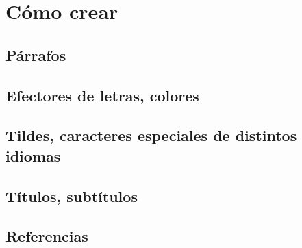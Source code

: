 \documentclass[10pt,journal,compsoc]{IEEEtran}
\begin{document}
\renewcommand{\thesubsection}{\thesection.\alph{subsection}}

\section{C\'omo crear}
	\subsection{P\'arrafos}	
	\subsection{Efectores de letras, colores}
	\subsection{Tildes, caracteres especiales de distintos idiomas}
	\subsection{T\'itulos, subt\'itulos}
	\subsection{Referencias}
\end{document}
